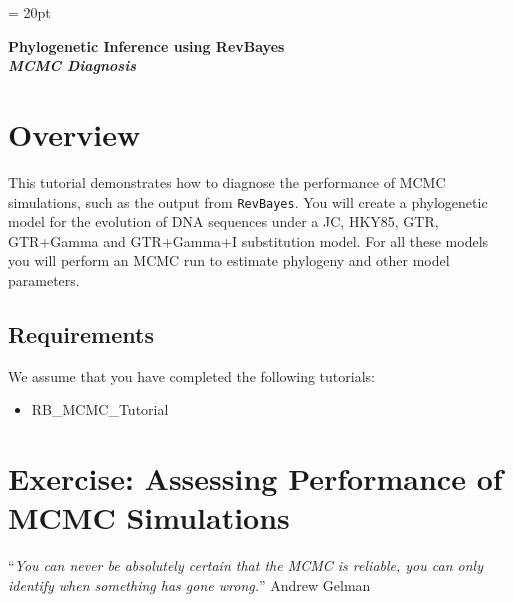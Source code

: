 \documentclass[11pt]{article}
\begin{document}
\renewcommand{\headrulewidth}{0.5pt}
\headsep = 20pt
\lhead{ }

\thispagestyle{plain}
\begin{center}

\textbf{\LARGE Phylogenetic Inference using RevBayes}\\\vspace{2mm}
\textbf{\it{\Large MCMC Diagnosis}}\\\vspace{2mm}
\end{center}

\section*{Overview}


This tutorial demonstrates how to diagnose the performance of MCMC simulations, such as the output from \verb!RevBayes!.
You will create a phylogenetic model for the evolution of DNA sequences under a JC, HKY85, GTR, GTR+Gamma and GTR+Gamma+I substitution model.
For all these models you will perform an MCMC run to estimate phylogeny and other model parameters.

\subsection*{Requirements}
We assume that you have completed the following tutorials:
\begin{itemize}
\item RB\_MCMC\_Tutorial
\end{itemize}



\newpage
\FloatBarrier
\section{Exercise: Assessing Performance of MCMC Simulations}

``{\it You can never be absolutely certain that the MCMC is reliable, you can only identify when something has gone wrong.}'' Andrew Gelman
\end{document}
